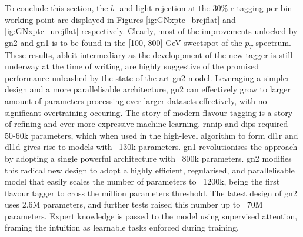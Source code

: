 To conclude this section, the $b$- and light-rejection at the 30\% $c$-tagging per bin working point are displayed in Figures \ref{ig:GNxptc_brejflat} and \ref{ig:GNxptc_urejflat} respectively. Clearly, most of the improvements unlocked by \gls{gn2} and \gls{gn1} is to be found in the [100, 800] GeV sweetspot of the $p_T$ spectrum. \\

These results, ableit intermediary as the developpment of the new tagger is still underway at the time of writing, are highly suggestive of the promised performance unleashed by the state-of-the-art \gls{gn2} model. Leveraging a simpler design and a more parallelisable architecture, \gls{gn2} can effectively grow to larger amount of parameters processing ever larger datasets effectively, with no significant overtraining occuring. The story of modern flavour tagging is a story of refining and ever more expressive machine learning. \gls{rnnip} and \gls{dips} required 50-60k parameters, which when used in the high-level algorithm to form \gls{dl1r} and \gls{dl1d} gives rise to models with ~130k parameters. \gls{gn1} revolutionises the approach by adopting a single powerful architecture with ~800k parameters. \gls{gn2} modifies this radical new design to adopt a highly efficient, regularised, and parallelisable model that easily scales the number of parameters to ~1200k, being the first flavour tagger to cross the million parameters threshold. The latest design of \gls{gn2} uses 2.6M parameters, and further tests raised this number up to ~70M parameters. Expert knowledge is passed to the model using supervised attention, framing the intuition as learnable tasks enforced during training. 
